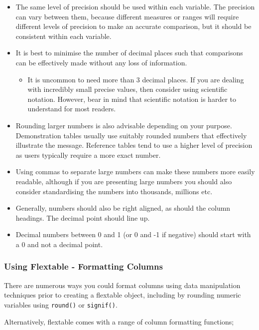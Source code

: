 \documentclass[
]{book}
\providecommand{\tightlist}{%
  \setlength{\itemsep}{0pt}\setlength{\parskip}{0pt}}
\begin{document}
\begin{itemize}
\item
  The same level of precision should be used within each variable. The precision can vary between them, because different measures or ranges will require different levels of precision to make an accurate comparison, but it should be consistent within each variable.
\item
  It is best to minimise the number of decimal places such that comparisons can be effectively made without any loss of information.

  \begin{itemize}
  \tightlist
  \item
    It is uncommon to need more than 3 decimal places. If you are dealing with incredibly small precise values, then consider using scientific notation. However, bear in mind that scientific notation is harder to understand for most readers.
  \end{itemize}
\item
  Rounding larger numbers is also advisable depending on your purpose. Demonstration tables usually use suitably rounded numbers that effectively illustrate the message. Reference tables tend to use a higher level of precision as users typically require a more exact number.
\item
  Using commas to separate large numbers can make these numbers more easily readable, although if you are presenting large numbers you should also consider standardising the numbers into thousands, millions etc.
\item
  Generally, numbers should also be right aligned, as should the column headings. The decimal point should line up.
\item
  Decimal numbers between 0 and 1 (or 0 and -1 if negative) should start with a 0 and not a decimal point.
\end{itemize}

\hypertarget{using-flextable---formatting-columns}{%
\subsubsection{Using Flextable - Formatting Columns}\label{using-flextable---formatting-columns}}

There are numerous ways you could format columns using data manipulation techniques prior to creating a flextable object, including by rounding numeric variables using \texttt{round()} or \texttt{signif()}.

Alternatively, flextable comes with a range of column formatting functions;
\end{document}
